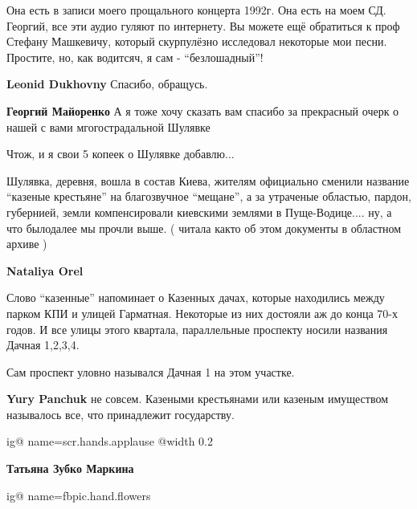 \begin{itemize}
\begin{itemize}

Она есть в записи моего прощального концерта 1992г. Она есть на моем СД.
Георгий, все эти аудио гуляют по интернету. Вы можете ещё обратиться к проф
Стефану Машкевичу, который скурпулёзно исследовал некоторые мои песни.
Простите, но, как водитсяч, я сам - \enquote{безлошадный}!

\begin{itemize} %
\textbf{Leonid Dukhovny} Спасибо, обращусь.

\textbf{Георгий Майоренко} А я тоже хочу сказать вам спасибо за прекрасный очерк о нашей с вами мгогострадальной Шулявке
\end{itemize} %


\end{itemize} %


Чтож, и я свои 5 копеек о Шулявке добавлю...

Шулявка, деревня, вошла в состав Киева, жителям официально сменили название
\enquote{казеные крестьяне} на благозвучное \enquote{мещане}, а за утраченые
областью, пардон, губернией, земли компенсировали киевскими землями в
Пуще-Водице.... ну, а что былодалее мы прочли выше. ( читала както об этом
документы в областном архиве )

\begin{itemize} %
\textbf{Nataliya Orel} 

Слово \enquote{казенные} напоминает о Казенных дачах, которые находились между парком
КПИ и улицей Гарматная. Некоторые из них достояли аж до конца 70-х годов. И все
улицы этого квартала, параллельные проспекту носили названия Дачная 1,2,3,4.

Сам проспект уловно назывался Дачная 1 на этом участке.

\textbf{Yury Panchuk} не совсем. Казеными крестьянами или казеным имуществом называлось все, что принадлежит государству.
\end{itemize} %


\ifcmt
  ig@ name=scr.hands.applause
  @width 0.2
\fi

\textbf{Татьяна Зубко Маркина}

\ifcmt
  ig@ name=fbpic.hand.flowers
\fi



\end{itemize}
